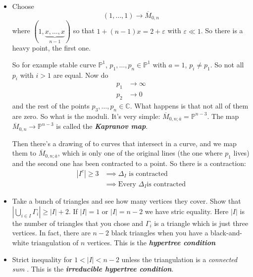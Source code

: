 \begin{example}\leavevmode 
	\begin{itemize}
	\item Choose
		\[(1,\ldots,1)\longrightarrow \overline{M}_{0,n}\]
		where $(1, \underbrace{x,\ldots,x}_{n-1})$ so that $1+(n-1)x=2+\varepsilon$ with $\varepsilon\ll1$. So there is a heavy point, the first one.

		So for example stable curve $\mathbb{P}^1$, $p_1,\ldots, p_n \in\mathbb{P}^1$ with $a=1$,  $p_i\neq p_1$. So not all $p_i$ with $i>1$ are equal. Now do
		\begin{align*}
			p_1&\to \infty\\
			p_2&\to 0
		\end{align*}
		and the rest of the points $p_3,\ldots, p_n \in\mathbb{C}$. What happens is that not all of them are zero. So what is the moduli. It's very simple: $\overline{M}_{0,n;\bar{a}}=\mathbb{P}^{n-3}$. The map $\overline{M}_{0,n}\to \mathbb{P}^{n-3}$ is called the \textit{\textbf{Kapranov map}}.

		Then there's a drawing of to curves that intersect in a curve, and we map them to  $\overline{M}_{0,n;\bar{a}}$, which is only one of the original lines (the one where $p_1$ lives) and the second one has been contracted to a point. So there is a contraction:
		\begin{align*}
			|I^c| \geq 3&\implies \Delta_I\text{ is contracted} \\
			&\implies \text{Every }  \Delta_I \text{is contracted} 
		\end{align*}
	\end{itemize}
\end{example}

\begin{exercise}
	\begin{itemize}
	\item Take a bunch of triangles and see how many vertices they cover. Show that $\left|\bigcup_{i\in I}\Gamma_i\right|\geq |I| +2 $. If $|I| =1$ or $|I| =n-2$ we have stric equality. Here $|I|$ is the number of triangles that you chose and $\Gamma_i$ is a triangle which is just three vertices. In fact, there are $n-2$ black triangles when you have a black-and-white triangulation of  $n$ vertices. This is the \textit{\textbf{hypertree condition}}

		\item Strict inequality for $1<|I| <n-2$ unless the triangulation is a \textit{connected sum} . This is the \textit{\textbf{irreducible hypertree condition}}.
	\end{itemize}
\end{exercise}

